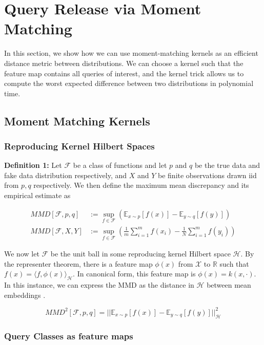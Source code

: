 \documentclass[
]{article}
\begin{document}
\section{Query Release via Moment Matching}

In this section, we show how we can use moment-matching kernels as an efficient distance metric between distributions. We can choose a kernel such that the feature map contains all queries of interest, and the kernel trick allows us to  compute the worst expected difference between two distributions in polynomial time.

\subsection{Moment Matching Kernels}

\subsubsection{Reproducing Kernel Hilbert Spaces}

\textbf{Definition 1:} Let \(\mathcal{F}\) be a class of functions and
let \(p\) and \(q\) be the true data and fake data distribution
respectively, and \(X\) and \(Y\) be finite observations drawn iid from
\(p,q\) respectively. We then define the maximum mean discrepancy and
its empirical estimate as

\begin{align}
  MMD[\mathcal{F},p,q] &:= \sup_{f\in\mathcal{F}} ( \mathbb{E}_{x\sim p}[f(x)] - \mathbb{E}_{y\sim q}[f(y)])\\
  MMD[\mathcal{F},X,Y] &:= \sup_{f\in\mathcal{F}} ( \frac{1}{m} \sum_{i=1}^m f(x_i) -  \frac{1}N \sum_{i=1}^m f(y_i) )
\end{align}

We now let $\mathcal{F}$ be the unit ball in some reproducing kernel Hilbert space $\mathcal{H}$. By the representer theorem, there is a feature map $\phi(x)$ from $\mathcal{X}$ to $\mathbb{R}$ such that $f(x) = \langle f, \phi(x) \rangle_\mathcal{H}$. In canonical form, this feature map is $\phi(x) = k(x, \cdot)$. In this instance, we can express the MMD as the distance in $\mathcal{H}$ between mean embeddings \cite{GBR+12}.

\begin{equation}
  MMD^2[\mathcal{F}, p, q] = || \mathbb{E}_{x\sim p}[f(x)] - \mathbb{E}_{y\sim q}[f(y)] ||^2_\mathcal{H}
\end{equation}

\subsubsection{Query Classes as feature maps}
\end{document}
